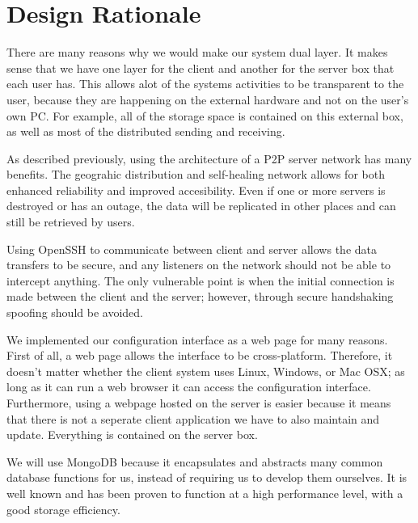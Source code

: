 \chapter{Design Rationale}
	There are many reasons why we would make our system dual layer.  It makes sense that we have one layer for the client and another for the server box that each user has.  This allows alot of the systems activities to be transparent to the user, because they are happening on the external hardware and not on the user's own PC.  For example, all of the storage space is contained on this external box, as well as most of the distributed sending and receiving.


	As described previously, using the architecture of a P2P server network has many benefits.  The geograhic distribution and self-healing network allows for both enhanced reliability and improved accesibility.  Even if one or more servers is destroyed or has an outage, the data will be replicated in other places and can still be retrieved by users.

	Using OpenSSH to communicate between client and server allows the data transfers to be secure, and any listeners on the network should not be able to intercept anything.  The only vulnerable point is when the initial connection is made between the client and the server; however, through secure handshaking spoofing should be avoided.

	We implemented our configuration interface as a web page for many reasons.  First of all, a web page allows the interface to be cross-platform.  Therefore, it doesn't matter whether the client system uses Linux, Windows, or Mac OSX; as long as it can run a web browser it can access the configuration interface.  Furthermore, using a webpage hosted on the server is easier because it means that there is not a seperate client application we have to also maintain and update.  Everything is contained on the server box.

	We will use MongoDB because it encapsulates and abstracts many common database functions for us, instead of requiring us to develop them ourselves.  It is well known and has been proven to function at a high performance level, with a good storage efficiency.